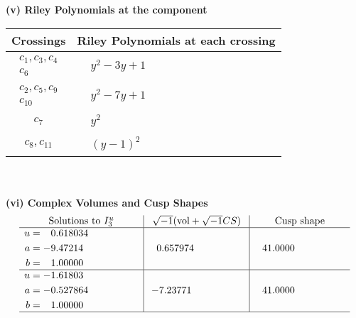 \documentclass[1p]{elsarticle_modified}
\theoremstyle{definition}
\newcommand{\I}{\sqrt{-1}}
\begin{document}
\newpage\renewcommand{\arraystretch}{1}
\flushleft \textbf{(v) Riley Polynomials at the component}\newline \\
\begin{tabular}{m{50pt}|m{274pt}}
Crossings & \hspace{64pt}Riley Polynomials at each crossing \\
\hline $$\begin{aligned}c_{1},c_{3},c_{4}\\c_{6}\end{aligned}$$&$\begin{aligned}
&y^2-3 y+1
\end{aligned}$\\
\hline $$\begin{aligned}c_{2},c_{5},c_{9}\\c_{10}\end{aligned}$$&$\begin{aligned}
&y^2-7 y+1
\end{aligned}$\\
\hline $$\begin{aligned}c_{7}\end{aligned}$$&$\begin{aligned}
&y^2
\end{aligned}$\\
\hline $$\begin{aligned}c_{8},c_{11}\end{aligned}$$&$\begin{aligned}
&(y-1)^2
\end{aligned}$\\
\hline
\end{tabular}\\~\\
\newpage\flushleft \textbf{(vi) Complex Volumes and Cusp Shapes}
$$\begin{array}{c|c|c}  
\text{Solutions to }I^u_{3}& \I (\text{vol} + \sqrt{-1}CS) & \text{Cusp shape}\\
 \hline 
\begin{aligned}
u &= \phantom{-}0.618034\phantom{ +0.000000I} \\
a &= -9.47214\phantom{ +0.000000I} \\
b &= \phantom{-}1.00000\phantom{ +0.000000I}\end{aligned}
 & \phantom{-}0.657974\phantom{ +0.000000I} & \phantom{-}41.0000\phantom{ +0.000000I} \\ \hline\begin{aligned}
u &= -1.61803\phantom{ +0.000000I} \\
a &= -0.527864\phantom{ +0.000000I} \\
b &= \phantom{-}1.00000\phantom{ +0.000000I}\end{aligned}
 & -7.23771\phantom{ +0.000000I} & \phantom{-}41.0000\phantom{ +0.000000I}\\
 \hline 
 \end{array}$$\newpage
\end{document}
